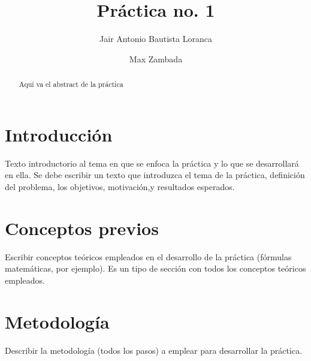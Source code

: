 \documentclass[sigconf]{acmart}
\begin{document}
\title{Práctica no. 1}

\author{Jair Antonio Bautista Loranca}

\author{Max Zambada}
\email{}

\begin{abstract}
	Aquí va el abstract de la práctica
\end{abstract}

\maketitle

\section{Introducción}
Texto introductorio al tema en que se enfoca la práctica y lo que se 
desarrollará en ella. Se debe escribir un texto que introduzca el tema de la 
práctica, definición del problema, los objetivos, motivación,y resultados 
esperados\cite{Cohen07}.

\section{Conceptos previos}
Escribir conceptos teóricos empleados en el desarrollo de la práctica (fórmulas 
matemáticas, por ejemplo). Es un tipo de sección con todos los conceptos 
teóricos empleados.

\section{Metodología}
Describir la metodología (todos los pasos) a emplear para desarrollar la 
práctica. 
\end{document}
